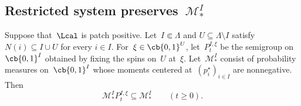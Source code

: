 \subsection{Restricted system preserves~$\mathcal{M}_*^I$}
\label{app:boundary-moment-preservation}

\begin{lemma}
\label{lem:boundary-moment-preservation}
Suppose that~$\Lcal$ is patch positive. Let~$I\Subset\Lambda$ and
$U\subseteq\Lambda\setminus I$ satisfy~$N(i)\subseteq I\cup U$ for every
$i\in I$. For~$\xi\in\cb{0,1}^U$, let~$P_t^{I,\xi}$ be the semigroup on
$\cb{0,1}^I$ obtained by fixing the spins on~$U$ at~$\xi$.
Let~$\mathcal M_*^I$ consist of probability measures on~$\cb{0,1}^I$
whose moments centered at~$(p_i^\star)_{i\in I}$ are
nonnegative. Then
\begin{equation*}
\mathcal M_*^I P_t^{I,\xi}\subseteq\mathcal M_*^I
\qquad(t\geq0).
\end{equation*}
\end{lemma}

